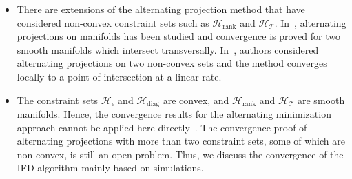 \begin{itemize}
%
\item There are extensions of the alternating projection method that have considered non-convex constraint sets such as $\bm{\mathcal{H}}_{\text{rank}}$ and $\bm{\mathcal{H}}_{\bm{\mathcal{T}}}$. In~\cite{Alternating_Lewis}, alternating projections on manifolds has been studied and convergence is proved for two smooth manifolds which intersect transversally. In~\cite{Lewis_convergence}, authors considered alternating projections on two non-convex sets and the method converges locally to a point of intersection at a linear rate. 
%
\item The constraint sets $\bm{\mathcal{H}}_{\epsilon}$ and $\bm{\mathcal{H}}_{\text{diag}}$ are convex, and $\bm{\mathcal{H}}_{\text{rank}}$ and $\bm{\mathcal{H}}_{\bm{\mathcal{T}}}$ are smooth manifolds. Hence, the convergence results for the alternating minimization approach cannot be applied here directly~\cite{Proj_jonathan}. The convergence proof of alternating projections with more than two constraint sets, some of which are non-convex, is still an open problem. Thus, we discuss the convergence of the IFD algorithm mainly based on simulations.
%
\end{itemize}


